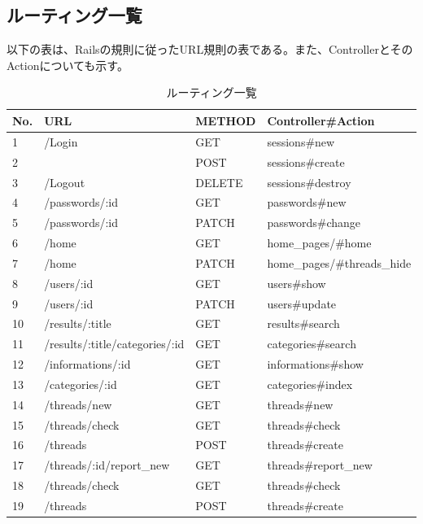 \documentclass[a4j]{jarticle}
\begin{document}
\subsection{ルーティング一覧}
以下の表は、Railsの規則に従ったURL規則の表である。また、ControllerとそのActionについても示す。



\begin{table}[htb]
  \caption{ルーティング一覧}
  \centering
  \begin{tabular}{|l|l|l||l|} \hline
    No.&   URL 						&METHOD & Controller\#Action \\ \hline \hline
	 1&	/Login  					 	& GET      & sessions\#new       \\    
       2&  ~			         			& POST    & sessions\#create	\\
	 3&	/Logout   				      &DELETE   &sessions\#destroy	\\
	 4&	/passwords/:id					&GET	  &passwords\#new    \\
	 5 & /passwords/:id					&PATCH	  &passwords\#change \\
	 6&	/home   						& GET 	   &home\_pages/\#home    \\  
       7&	/home   						& PATCH 	   &home\_pages/\#threads\_hide \\   	               
	 8&	/users/:id     					&  GET  	    &  users\#show       \\      
	 9&	/users/:id     					 & PATCH   &  users\#update       \\               
	10&	/results/:title         			& GET   	    & results\#search      \\
	11& /results/:title/categories/:id		&GET		& categories\#search	\\
	12&	/informations/:id				  & GET       & informations\#show      \\
	13&	/categories/:id    		   		 &   GET      & categories\#index    \\
	14&	/threads/new      	 	  		 &  GET      &  threads\#new         \\
	15&/threads/check      		       &  GET      & threads\#check       \\
	16&/threads                   		       &  POST    &threads\#create      \\
	17&/threads/:id/report\_new   		&   GET      &threads\#report\_new  \\
	18&	/threads/check               		&   GET      & threads\#check       \\
	19&	/threads                      		 & POST     & threads\#create     \\ 

\end{tabular}
\end{table}
\end{document}
